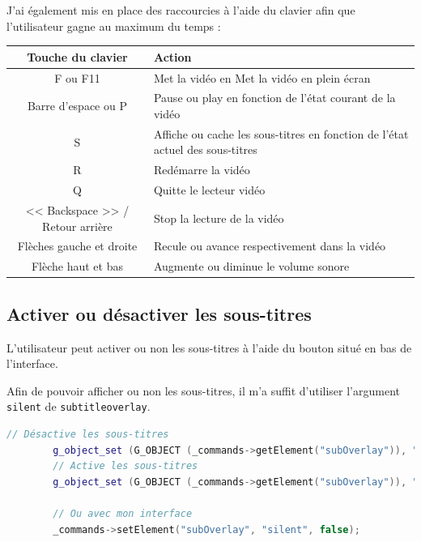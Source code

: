 \documentclass[a4paper, 11pt]{article}
\begin{document}
	J'ai également mis en place des raccourcies à l'aide du clavier afin que l'utilisateur gagne au maximum du temps : 

	\begin{tabular}{c|p{10cm}}
		\textbf{Touche du clavier} & \textbf{Action}\\
		\hline
		F ou F11& Met la vidéo en Met la vidéo en plein écran\\
		\hline
		Barre d'espace ou P&Pause ou play en fonction de l'état courant de la vidéo\\
		\hline
		S&Affiche ou cache les sous-titres en fonction de l'état actuel des sous-titres\\
		\hline
		R&Redémarre la vidéo\\
		\hline
		Q&Quitte le lecteur vidéo\\
		\hline
		<< Backspace >> / Retour arrière &Stop la lecture de la vidéo \\
		\hline
		Flèches gauche et droite&Recule ou avance respectivement dans la vidéo\\
		\hline
		Flèche haut et bas & Augmente ou diminue le volume sonore\\
		\hline
	\end{tabular}
	\subsection{Activer ou désactiver les sous-titres}
	L'utilisateur peut activer ou non les sous-titres à l'aide du bouton situé en bas de l'interface. 

	Afin de pouvoir afficher ou non les sous-titres, il m'a suffit d'utiliser l'argument \texttt{silent} de \texttt{subtitleoverlay}.
	\begin{lstlisting}[language=C++, caption=Affichage ou non des sous-titres]
		// Désactive les sous-titres
		g_object_set (G_OBJECT (_commands->getElement("subOverlay")), "silent", false, NULL); 
		// Active les sous-titres
		g_object_set (G_OBJECT (_commands->getElement("subOverlay")), "silent", true, NULL); 

		// Ou avec mon interface
		_commands->setElement("subOverlay", "silent", false);

	\end{lstlisting}
	\appendix
	\lstlistoflistings
	\listoffigures
	
\end{document}
